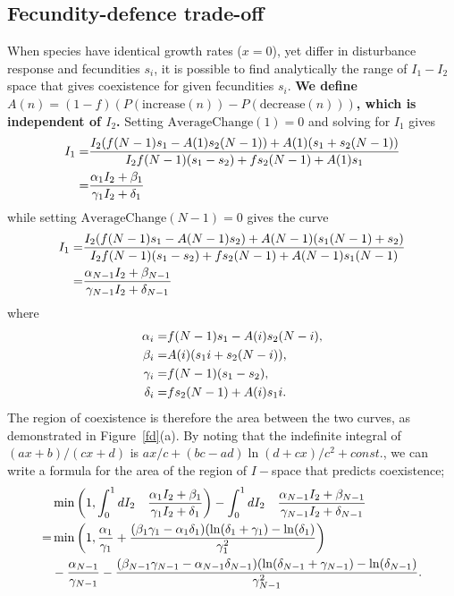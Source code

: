 \documentclass[preprint,10pt,reqno]{report}
\begin{document}
\subsection{Fecundity-defence trade-off}
When species have identical growth rates ($x=0$), yet differ in disturbance response and fecundities $s_i$, it is possible to find analytically the range of $I_1 - I_2$ space that gives coexistence for given fecundities $s_i$.\textbf{ We define $A(n)=(1-f)(P(\text{increase}(n))-P(\text{decrease}(n)))$, which is independent of $I_2$.} Setting $\text{AverageChange}(1)=0$ and solving for $I_1$ gives
\begin{align}
\label{fdac1sol}
I_1=&\frac{I_2(f(N-1)s_1-A(1)s_2(N-1)) +A(1)(s_1+s_2(N-1))}{I_2f(N-1)(s_1-s_2) +fs_2(N-1) +A(1)s_1}\notag \\
=&\frac{\alpha_1 I_2 +\beta_1}{\gamma_1 I_2+\delta_1}
\end{align}
while setting $\text{AverageChange}(N-1)=0$ gives the curve
\begin{align}
\label{fdacnsol}
I_1=&\frac{I_2(f(N-1)s_1-A(N-1)s_2) +A(N-1)(s_1(N-1)+s_2)}{I_2f(N-1)(s_1-s_2) +fs_2(N-1) +A(N-1)s_1(N-1)}\notag \\
=&\frac{\alpha_{N-1} I_2 +\beta_{N-1}}{\gamma_{N-1} I_2+\delta_{N-1}}
\end{align}
where
\begin{align}
\alpha_i =& f(N-1)s_1 - A(i) s_2 (N-i), \notag \\
\beta_i =& A(i) (s_1 i + s_2(N-i)), \notag \\
\gamma_i =& f(N-1)(s_1-s_2), \notag \\
\delta_i =& fs_2(N-1) + A(i)s_1 i. \notag
\end{align}
The region of coexistence is therefore the area between the two curves, as demonstrated in Figure~\ref{fd}(a). By noting that the indefinite integral of $(a x +b)/(c x +d)$ is $ax/c+(bc-ad)\ln(d+cx)/c^2 +const.$, we can write a formula for the area of the region of $I-$space that predicts coexistence;
\begin{align}
&\min \left(1, \int_0^1 dI_2 \quad \frac{\alpha_1 I_2 +\beta_1}{\gamma_1 I_2+\delta_1} \right) -  \int_0^1 dI_2\quad \frac{\alpha_{N-1} I_2 +\beta_{N-1}}{\gamma_{N-1} I_2+\delta_{N-1}}  \notag \\
=&\min\left(1,\frac{\alpha_1}{\gamma_1}+\frac{(\beta_1 \gamma_1 - \alpha_1 \delta_1)(\ln(\delta_1 +\gamma_1)-\ln(\delta_1)}{\gamma_1^2}\right) \\
&-\frac{\alpha_{N-1}}{\gamma_{N-1}}-\frac{(\beta_{N-1} \gamma_{N-1} - \alpha_{N-1} \delta_{N-1})(\ln(\delta_{N-1} +\gamma_{N-1})-\ln(\delta_{N-1})}{\gamma_{N-1}^2}. \notag
\end{align}
\end{document}
